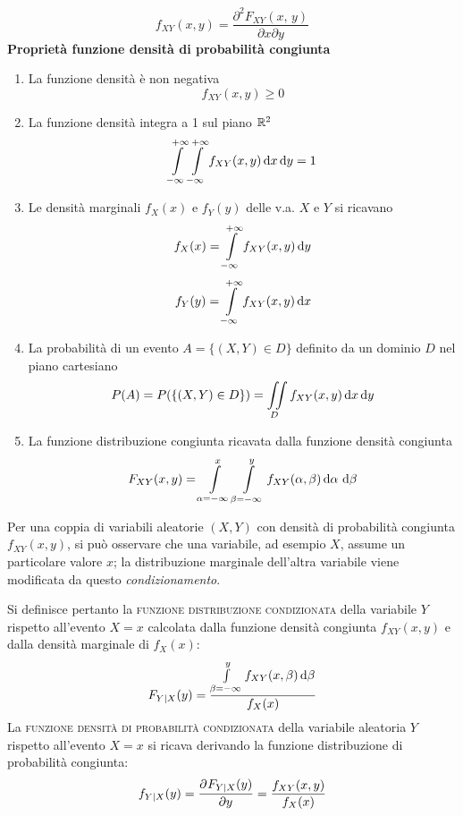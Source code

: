 \begin{equation}
f_{XY}(x,y)=\frac{\partial^2 F_{XY}(x,\,y)}{\partial x\partial y}
\end{equation}
\textbf{Proprietà funzione densità di probabilità congiunta}
\begin{enumerate}
\item La funzione densità è non negativa
\begin{equation}f_{XY}(x,y)\geq 0\end{equation}
\item La funzione densità integra a 1 sul piano $\mathbb{R}^2$
\begin{equation}\int\limits_{-\infty}^{+\infty}{\int\limits_{-\infty}^{+\infty}{f_{XY}(x,y)}{\,\mathop{}\!\mathrm{d}{x}}}{\,\mathop{}\!\mathrm{d}{y}}=1\end{equation}
\item Le densità marginali $f_X(x)$ e $f_Y(y)$ delle v.a. $X$ e $Y$ si ricavano
\begin{equation}
f_X(x)=\int\limits_{-\infty}^{+\infty}{f_{XY}(x,y)}{\,\mathop{}\!\mathrm{d}{y}}
\end{equation}
\begin{equation}
f_Y(y)=\int\limits_{-\infty}^{+\infty}{f_{XY}(x,y)}{\,\mathop{}\!\mathrm{d}{x}}
\end{equation}
\item La probabilità di un evento $A=\{(X,Y)\in D\}$ definito da un dominio $D$ nel piano cartesiano
\begin{equation}\label{eq:funz_dens_prob_cong_dominio}
P(A)=P(\{(X,Y)\in D\})=\iint\limits_{D}{f_{XY}(x,y)\mathop{}\!\mathrm{d} x \mathop{}\!\mathrm{d} y}\end{equation}
\item La funzione distribuzione congiunta ricavata dalla funzione densità congiunta
\begin{equation}
F_{XY}(x,y)=\int\limits_{\alpha=-\infty}^{x}\int\limits_{\beta=-\infty}^{y}{f_{XY}(\alpha,\beta)}{\,\mathop{}\!\mathrm{d} \alpha\,\mathop{}\!\mathrm{d} \beta}\end{equation}
\end{enumerate}

Per una coppia di variabili aleatorie $(X,Y)$ con densità di probabilità congiunta $f_{XY}(x,y)$, si può osservare che una variabile, ad esempio $X$, assume un particolare valore $x$; la distribuzione marginale dell'altra variabile viene modificata da questo \emph{condizionamento}.

Si definisce pertanto la \textsc{funzione distribuzione condizionata} della variabile $Y$ rispetto all'evento $X=x$ calcolata dalla funzione densità congiunta $f_{XY}(x,y)$ e dalla densità marginale di $f_X(x)$:
\begin{equation}
F_{Y|X}(y)=\frac{\int\limits_{\beta=-\infty}^{y}{f_{XY}(x,\beta)}{\,\mathop{}\!\mathrm{d}{\beta}}}{f_X(x)}
\end{equation}
La \textsc{funzione densità di probabilità condizionata} della variabile aleatoria $Y$ rispetto all'evento $X=x$ si ricava derivando la funzione distribuzione di probabilità congiunta:
\begin{equation}
f_{Y|X}(y)=\frac{\partial^{}F_{Y|X}(y)}{\partial y^{}}=\frac{f_{XY}(x,y)}{f_X(x)}
\end{equation}


